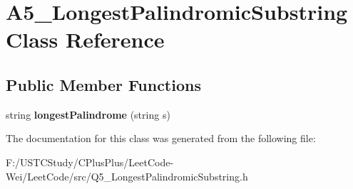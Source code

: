 \hypertarget{class_a5___longest_palindromic_substring}{}\section{A5\+\_\+\+Longest\+Palindromic\+Substring Class Reference}
\label{class_a5___longest_palindromic_substring}
\subsection*{Public Member Functions}
\begin{DoxyCompactItemize}
\item 
\hypertarget{class_a5___longest_palindromic_substring_aef25c5f7204d18ecd7857ec58c067825}{}\label{class_a5___longest_palindromic_substring_aef25c5f7204d18ecd7857ec58c067825} 
string {\bfseries longest\+Palindrome} (string s)
\end{DoxyCompactItemize}


The documentation for this class was generated from the following file\+:\begin{DoxyCompactItemize}
\item 
F\+:/\+U\+S\+T\+C\+Study/\+C\+Plus\+Plus/\+Leet\+Code-\/\+Wei/\+Leet\+Code/src/Q5\+\_\+\+Longest\+Palindromic\+Substring.\+h\end{DoxyCompactItemize}
